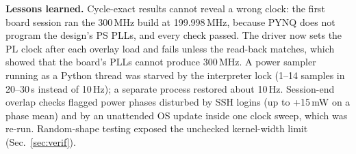 \textbf{Lessons learned.} Cycle-exact results cannot reveal a wrong clock:
the first board session ran the 300\,MHz build at 199.998\,MHz, because
PYNQ does not program the design's PS PLLs, and every check passed. The
driver now sets the PL clock after each overlay load and fails unless the
read-back matches, which showed that the board's PLLs cannot produce
300\,MHz. A power sampler running as a Python thread was starved by the
interpreter lock (1--14 samples in 20--30\,s instead of 10\,Hz); a separate
process restored about 10\,Hz. Session-end overlap checks flagged power
phases disturbed by SSH logins (up to +15\,mW on a phase mean) and by an
unattended OS update inside one clock sweep, which was re-run. Random-shape
testing exposed the unchecked kernel-width limit (Sec.~\ref{sec:verif}).
